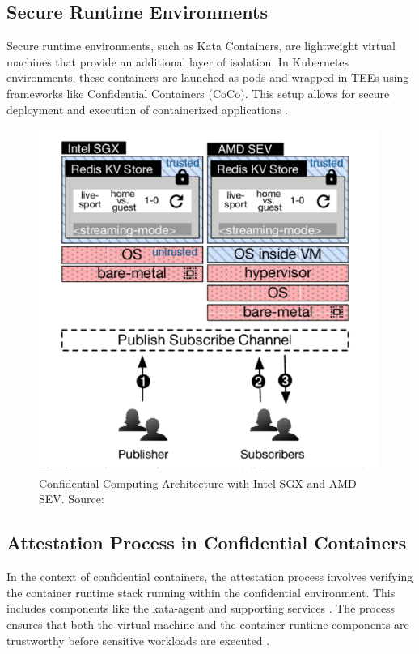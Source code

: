 \documentclass[conference]{IEEEtran}
\begin{document}
\subsection{Secure Runtime Environments}
Secure runtime environments, such as Kata Containers, are lightweight virtual 
machines that provide an additional layer of isolation. In Kubernetes environments, 
these containers are launched as pods and wrapped in TEEs using frameworks like Confidential 
Containers (CoCo). This setup allows for secure deployment and execution of containerized 
applications \cite{secure_runtime_environments}. 

\begin{figure}[H]
\centerline{\includegraphics[width=\linewidth]{figures/architecture.png}}
\caption{Confidential Computing Architecture with Intel SGX and AMD SEV. Source: \cite{researchgate_architecture}}
\label{fig:architecture}
\end{figure}

\subsection{Attestation Process in Confidential Containers}
In the context of confidential containers, the attestation process involves verifying the 
container runtime stack running within the confidential environment. This includes components 
like the kata-agent and supporting services \cite{secure_runtime_environments}. The process ensures that both the virtual machine 
and the container runtime components are trustworthy before sensitive workloads are executed \cite{remote_attestation}. 
\end{document}
